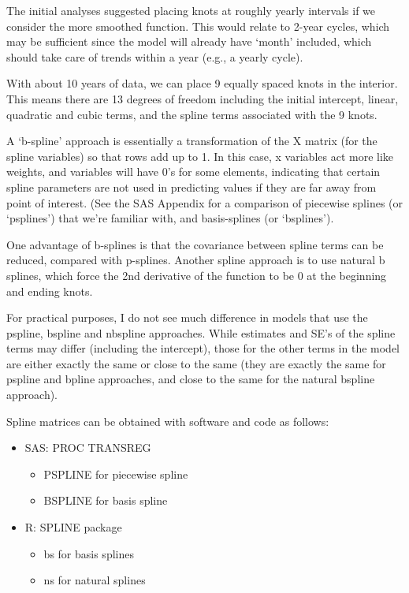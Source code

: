 \documentclass[
  9pt,
  ignorenonframetext,
]{beamer}
\begin{document}
\begin{frame}{}
\protect\hypertarget{section-14}{}
The initial analyses suggested placing knots at roughly yearly intervals
if we consider the more smoothed function. This would relate to 2-year
cycles, which may be sufficient since the model will already have
`month' included, which should take care of trends within a year (e.g.,
a yearly cycle).

With about 10 years of data, we can place 9 equally spaced knots in the
interior. This means there are 13 degrees of freedom including the
initial intercept, linear, quadratic and cubic terms, and the spline
terms associated with the 9 knots.

A `b-spline' approach is essentially a transformation of the X matrix
(for the spline variables) so that rows add up to 1. In this case, x
variables act more like weights, and variables will have 0's for some
elements, indicating that certain spline parameters are not used in
predicting values if they are far away from point of interest. (See the
SAS Appendix for a comparison of piecewise splines (or `psplines') that
we're familiar with, and basis-splines (or `bsplines').

One advantage of b-splines is that the covariance between spline terms
can be reduced, compared with p-splines. Another spline approach is to
use natural b splines, which force the 2nd derivative of the function to
be 0 at the beginning and ending knots.
\end{frame}

\begin{frame}{}
\protect\hypertarget{section-15}{}
For practical purposes, I do not see much difference in models that use
the pspline, bspline and nbspline approaches. While estimates and SE's
of the spline terms may differ (including the intercept), those for the
other terms in the model are either exactly the same or close to the
same (they are exactly the same for pspline and bpline approaches, and
close to the same for the natural bspline approach).

\begin{block}{Spline matrices can be obtained with software and code as
follows:}
\protect\hypertarget{spline-matrices-can-be-obtained-with-software-and-code-as-follows}{}
\begin{itemize}
\item
  SAS: PROC TRANSREG

  \begin{itemize}
  \item
    PSPLINE for piecewise spline
  \item
    BSPLINE for basis spline
  \end{itemize}
\item
  R: SPLINE package

  \begin{itemize}
  \item
    bs for basis splines
  \item
    ns for natural splines
  \end{itemize}
\end{itemize}
\end{block}
\end{frame}
\end{document}
